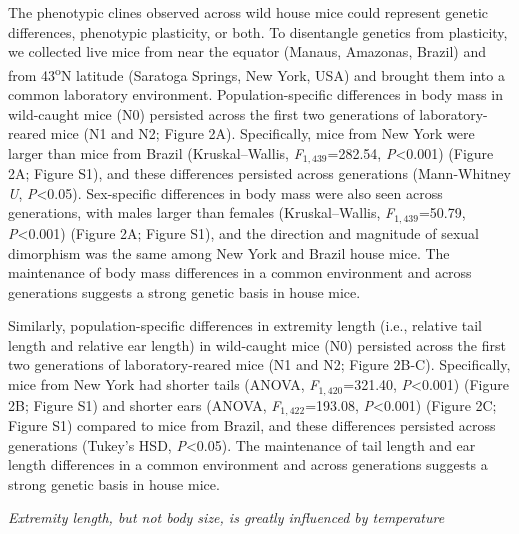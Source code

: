 \documentclass[]{article}
\begin{document}
The phenotypic clines observed across wild house mice could represent
genetic differences, phenotypic plasticity, or both. To disentangle
genetics from plasticity, we collected live mice from near the equator
(Manaus, Amazonas, Brazil) and from 43\textsuperscript{o}N latitude
(Saratoga Springs, New York, USA) and brought them into a common
laboratory environment. Population-specific differences in body mass in
wild-caught mice (N0) persisted across the first two generations of
laboratory-reared mice (N1 and N2; Figure 2A). Specifically, mice from
New York were larger than mice from Brazil (Kruskal--Wallis,
\emph{F}\(_{1,439}\)=282.54, \emph{P}\textless{}0.001) (Figure 2A;
Figure S1), and these differences persisted across generations
(Mann-Whitney \emph{U}, \emph{P}\textless{}0.05). Sex-specific
differences in body mass were also seen across generations, with males
larger than females (Kruskal--Wallis, \emph{F}\(_{1,439}\)=50.79,
\emph{P}\textless{}0.001) (Figure 2A; Figure S1), and the direction and
magnitude of sexual dimorphism was the same among New York and Brazil
house mice. The maintenance of body mass differences in a common
environment and across generations suggests a strong genetic basis in
house mice.

Similarly, population-specific differences in extremity length (i.e.,
relative tail length and relative ear length) in wild-caught mice (N0)
persisted across the first two generations of laboratory-reared mice (N1
and N2; Figure 2B-C). Specifically, mice from New York had shorter tails
(ANOVA, \emph{F}\(_{1,420}\)=321.40, \emph{P}\textless{}0.001) (Figure
2B; Figure S1) and shorter ears (ANOVA, \emph{F}\(_{1,422}\)=193.08,
\emph{P}\textless{}0.001) (Figure 2C; Figure S1) compared to mice from
Brazil, and these differences persisted across generations (Tukey's HSD,
\emph{P}\textless{}0.05). The maintenance of tail length and ear length
differences in a common environment and across generations suggests a
strong genetic basis in house mice.

\vspace{3.5mm}

\noindent\emph{Extremity length, but not body size, is greatly
influenced by temperature}
\end{document}
